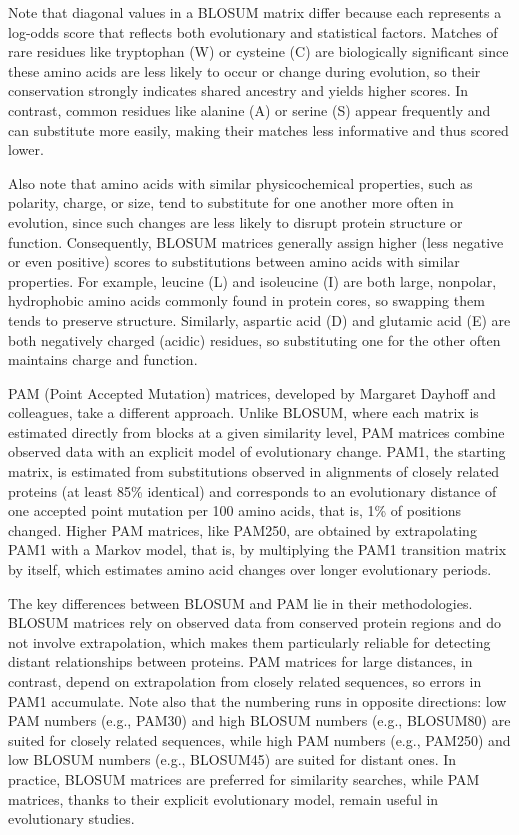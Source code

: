 Note that diagonal values in a BLOSUM matrix differ because each represents a log-odds score that reflects both evolutionary and statistical factors. Matches of rare residues like tryptophan (W) or cysteine (C) are biologically significant since these amino acids are less likely to occur or change during evolution, so their conservation strongly indicates shared ancestry and yields higher scores. In contrast, common residues like alanine (A) or serine (S) appear frequently and can substitute more easily, making their matches less informative and thus scored lower.

Also note that amino acids with similar physicochemical properties, such as polarity, charge, or size, tend to substitute for one another more often in evolution, since such changes are less likely to disrupt protein structure or function. Consequently, BLOSUM matrices generally assign higher (less negative or even positive) scores to substitutions between amino acids with similar properties. For example, leucine (L) and isoleucine (I) are both large, nonpolar, hydrophobic amino acids commonly found in protein cores, so swapping them tends to preserve structure. Similarly, aspartic acid (D) and glutamic acid (E) are both negatively charged (acidic) residues, so substituting one for the other often maintains charge and function.

PAM (Point Accepted Mutation) matrices, developed by Margaret Dayhoff and colleagues, take a different approach. 
Unlike BLOSUM, where each matrix is estimated directly from blocks at a given similarity level, PAM matrices combine observed data with an explicit model of evolutionary change. PAM1, the starting matrix, is estimated from substitutions observed in alignments of closely related proteins (at least 85\% identical) and corresponds to an evolutionary distance of one accepted point mutation per 100 amino acids, that is, 1\% of positions changed. Higher PAM matrices, like PAM250, are obtained by extrapolating PAM1 with a Markov model, that is, by multiplying the PAM1 transition matrix by itself, which estimates amino acid changes over longer evolutionary periods.

The key differences between BLOSUM and PAM lie in their methodologies. BLOSUM matrices rely on observed data from conserved protein regions and do not involve extrapolation, which makes them particularly reliable for detecting distant relationships between proteins. PAM matrices for large distances, in contrast, depend on extrapolation from closely related sequences, so errors in PAM1 accumulate. Note also that the numbering runs in opposite directions: low PAM numbers (e.g., PAM30) and high BLOSUM numbers (e.g., BLOSUM80) are suited for closely related sequences, while high PAM numbers (e.g., PAM250) and low BLOSUM numbers (e.g., BLOSUM45) are suited for distant ones. In practice, BLOSUM matrices are preferred for similarity searches, while PAM matrices, thanks to their explicit evolutionary model, remain useful in evolutionary studies.